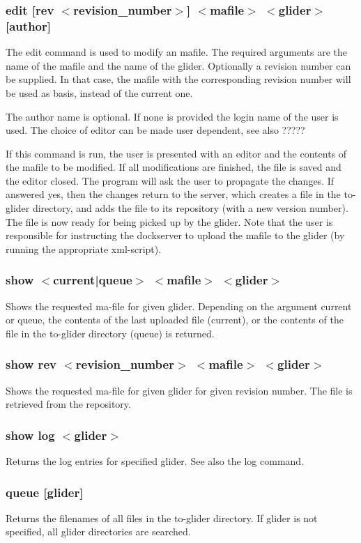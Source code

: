 \documentclass{article}
\begin{document}
\subsubsection*{edit [rev $<$revision\_number$>$] $<$mafile$>$ $<$glider$>$
  [author]}
The edit command is used to modify an mafile. The required arguments
are the name of the mafile and the name of the glider. Optionally a
revision number can be supplied. In that case, the mafile with the
corresponding revision number will be used as basis, instead of the
current one. 

The author name is optional. If none is provided the login name of the
user is used. The choice of editor can be made user dependent, see
also ?????

If this command is run, the user is presented with an editor and the
contents of the mafile to be modified. If all modifications are
finished, the file is saved and the editor closed. The program will
ask the user to propagate the changes. If answered yes, then the
changes return to the server, which creates a file in the to-glider
directory, and adds the file to its repository (with a new version
number). The file is now ready for being picked up by the glider. Note
that the user is responsible for instructing the dockserver to upload
the mafile to the glider (by running the appropriate xml-script).

\subsubsection*{show $<$current|queue$>$ $<$mafile$>$ $<$glider$>$}
Shows the requested ma-file for given glider. Depending on the
argument current or queue, the contents of the last uploaded file
(current), or the contents of the file in the to-glider directory (queue) is
returned.

\subsubsection*{show rev $<$revision\_number$>$ $<$mafile$>$ $<$glider$>$}
Shows the requested ma-file for given glider for given revision
number. The file is retrieved from the repository.

\subsubsection*{show log $<$glider$>$}
Returns the log entries for specified glider. See also the log command.
\subsubsection*{queue [glider]}
Returns the filenames of all files in the to-glider directory. If
glider is not specified, all glider directories are searched.
\end{document}
